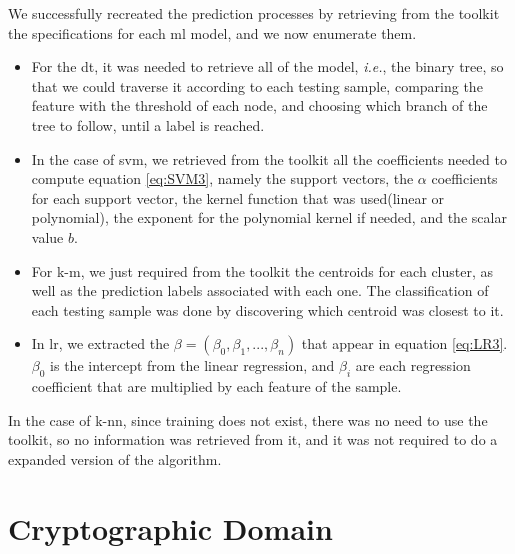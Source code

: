 We successfully recreated the prediction processes by retrieving from the toolkit the specifications for each \ac{ml} model, and we now enumerate them.

\begin{itemize}
	
    \item For the \ac{dt}, it was needed to retrieve all of the model, \textit{i.e.}, the binary tree, so that we could traverse it according to each testing sample, comparing the feature with the threshold of each node, and choosing which branch of the tree to follow, until a label is reached. 

    \item In the case of \ac{svm}, we retrieved from the toolkit all the coefficients needed to compute equation \ref{eq:SVM3}, namely the support vectors, the $\alpha$ coefficients for each support vector, the kernel function that was used(linear or polynomial), the exponent for the polynomial kernel if needed, and the scalar value $b$.

    \item For \ac{k-m}, we just required from the toolkit the centroids for each cluster, as well as the prediction labels associated with each one. The classification of each testing sample was done by discovering which centroid was closest to it.

    \item In \ac{lr}, we extracted the $\beta=(\beta_0,\beta_1,...,\beta_n)$ that appear in equation \ref{eq:LR3}. $\beta_0$ is the intercept from the linear regression, and $\beta_i$ are each regression coefficient that are multiplied by each feature of the sample.

\end{itemize}

In the case of \ac{k-nn}, since training does not exist, there was no need to use the toolkit, so no information was retrieved from it, and it was not required to do a expanded version of the algorithm.



\section{Cryptographic Domain}
\label{sec:CryptoDomainImplementation}

